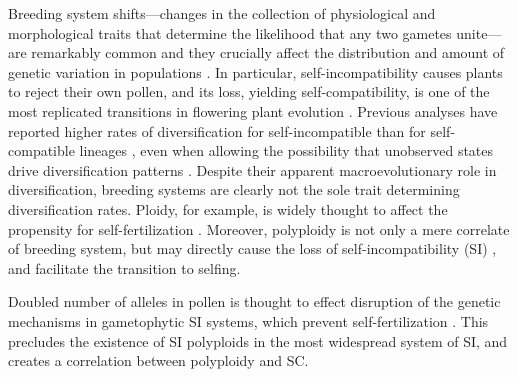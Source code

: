 Breeding system shifts---changes in the collection of physiological and morphological traits that determine the likelihood that any two gametes unite---are remarkably common and they crucially affect the distribution and amount of genetic variation in populations \citep{stebbins1974, barrett2013}.
In particular, self-incompatibility causes plants to reject their own pollen, and its loss, yielding self-compatibility, is one of the most replicated transitions in flowering plant evolution \citep{stebbins1974,igic_2008}. %
Previous analyses have reported higher rates of diversification for self-incompatible than for self-compatible lineages \citep{goldberg_2010, devos2014}, even when allowing the possibility that unobserved states drive diversification patterns \citep{freyman_2018}.
Despite their apparent macroevolutionary role in diversification, breeding systems are clearly not the sole trait determining diversification rates.
Ploidy, for example, is widely thought to affect the propensity for self-fertilization \citep{stebbins1950}. 
Moreover, polyploidy is not only a mere correlate of breeding system, but may directly cause the loss of self-incompatibility (SI) \citep{stout1942, lewis1947}, and facilitate the transition to selfing.

Doubled number of alleles in pollen is thought to effect disruption of the genetic mechanisms in gametophytic SI systems, which prevent self-fertilization \citep{entani1999, tsukamoto2005, kubo2010}. 
This precludes the existence of SI polyploids in the most widespread system of SI, and creates a correlation between polyploidy and SC.

